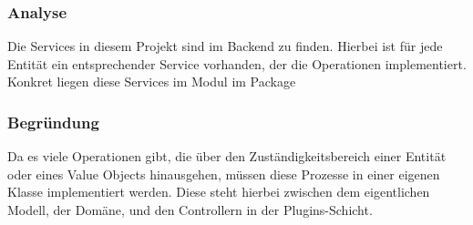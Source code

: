         \subsubsection{Analyse}
        Die Services in diesem Projekt sind im Backend zu finden. Hierbei ist für jede Entität ein entsprechender Service vorhanden, der die Operationen implementiert. Konkret liegen diese Services im Modul  im Package 

        \subsubsection{Begründung}
        Da es viele Operationen gibt, die über den Zuständigkeitsbereich einer Entität oder eines Value Objects hinausgehen, müssen diese Prozesse in einer eigenen Klasse implementiert werden. Diese steht hierbei zwischen dem eigentlichen Modell, der Domäne, und den Controllern in der Plugins-Schicht.
